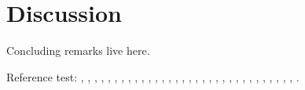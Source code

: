 \section{Discussion}
\label{sec:discussion}

Concluding remarks live here.

Reference test:
\cite{ArcherWest2003},
\cite{BarrettJolleyetal2010},
\cite{BuckwalterMankin1998},
\cite{CarneyMuir1988},
\cite{Chaetal2009},
\cite{Chuetal2006},
\cite{Clarketal2011},
\cite{Edwardsetal1994},
\cite{Fassbender1987},
\cite{Grishkoetal2010},
\cite{Halletal1996},
\cite{Hille2001},
\cite{HorriganAldrich2002},
\cite{LeeUrban1997},
\cite{LesageLazdunski2000},
\cite{Lewisetal2011},
\cite{Maleckaretal2009},
\cite{Mankin1982},
\cite{MillwardSadleretal2000},
\cite{Mobasherietal2007},
\cite{Mobasherietal2005},
\cite{Nygrenetal1998},
\cite{Poole1997},
\cite{RadhakrishnanHindmarsh1993},
\cite{Scholz2002},
\cite{Stein1990},
\cite{Stockwell1991},
\cite{Sugimotoetal1996},
\cite{Tsugaetal2001},
\cite{UNKNOWN},
\cite{Urban1994},
\cite{Wilkinsetal2000},
\cite{Wuetal2007}.

